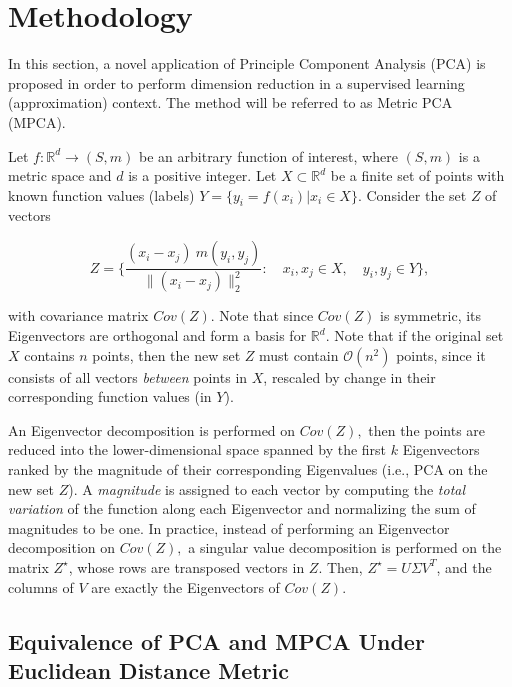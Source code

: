 \documentclass{scspaperproc}
\theoremstyle{scsthe}
\begin{document}
\section{Methodology}
\label{sec:methodology}

In this section, a novel application of Principle Component Analysis
(PCA) is proposed in order to perform dimension reduction in a
supervised learning (approximation) context. The method will be
referred to as Metric PCA (MPCA).

Let $f : \mathbb{R}^d \rightarrow (S,m)$ be an arbitrary function of
interest, where $(S,m)$ is a metric space and $d$ is a positive
integer.  Let $X \subset \mathbb{R}^d$ be a finite set of points with
known function values (labels) $Y = \{y_i = f(x_i) | x_i \in X\}$.
Consider the set $Z$ of vectors

\begin{equation*}
  Z = \bigg\{ \frac{(x_i - x_j)\  m(y_i, y_j)}{\|(x_i - x_j)\|_2^2} : \quad x_i, x_j \in X, \quad y_i, y_j \in Y \bigg\},
\end{equation*}

\noindent with covariance matrix $Cov(Z).$ Note that since $Cov(Z)$ is
symmetric, its Eigenvectors are orthogonal and form a basis for
$\mathbb{R}^d$. Note that if the original set $X$ contains
$n$ points, then the new set $Z$ must contain $\mathcal{O}(n^2)$
points, since it consists of all vectors \textit{between} points in $X$,
rescaled by change in their corresponding function values (in $Y$).

An Eigenvector decomposition is performed on $Cov(Z),$ then the points
are reduced into the lower-dimensional space spanned by the first $k$
Eigenvectors ranked by the magnitude of their corresponding
Eigenvalues (i.e., PCA on the new set $Z$). A \textit{magnitude} is
assigned to each vector by computing the \textit{total variation} of
the function along each Eigenvector and normalizing the sum of
magnitudes to be one. In practice, instead of performing an
Eigenvector decomposition on $Cov(Z),$ a singular value decomposition
is performed on the matrix $\displaystyle Z^\star$, whose rows are
transposed vectors in $Z$. Then, $Z^\star = U \Sigma V^T$, and the
columns of $V$ are exactly the Eigenvectors of $Cov(Z).$

\subsection{Equivalence of PCA and MPCA Under Euclidean Distance Metric}
\end{document}
